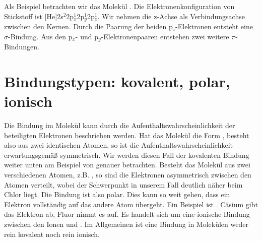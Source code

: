 Als Beispiel betrachten wir das Molekül . Die Elektronenkonfiguration von Stickstoff ist [He]2s$^2$2p$_x^1$2p$_y^1$2p$_z^1$. Wir nehmen die z-Achse als Verbindungsachse zwischen den Kernen.
Durch die Paarung der beiden p$_z$-Elektronen entsteht eine $\sigma$-Bindung. Aus den p$_x$- und p$_y$-Elektronenpaaren entstehen zwei weitere $\pi$-Bindungen.
 
 









\section{Bindungstypen: kovalent, polar, ionisch}

Die Bindung im Molekül kann durch die Aufenthaltswahrscheinlichkeit der beteiligten Elektronen beschrieben werden. Hat das Molekül die Form , besteht also aus zwei identischen Atomen, so ist die Aufenthaltswahrscheinlichkeit erwartungsgemäß symmetrisch. Wir werden diesen Fall der kovalenten Bindung weiter unten am Beispiel von  genauer betrachten. Besteht das Molekül aus zwei verschiedenen Atomen, z.B. , so sind die Elektronen asymmetrisch zwischen den Atomen verteilt, wobei der Schwerpunkt in unserem Fall deutlich näher beim Chlor liegt. Die Bindung ist also polar. Dies kann so weit gehen, dass ein Elektron vollständig auf das andere Atom übergeht. Ein Beispiel ist . Cäsium gibt das Elektron ab, Fluor nimmt es auf. Es handelt sich um eine ionische Bindung zwischen den Ionen  und . Im Allgemeinen ist eine Bindung in Molekülen weder rein kovalent noch rein ionisch.


